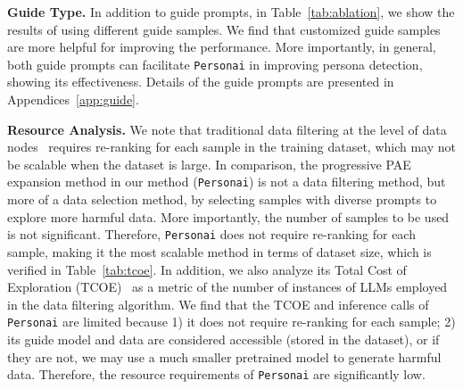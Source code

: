 {\textbf{Guide Type.} In addition to guide prompts, in Table~\ref{tab:ablation}, we show the results of using different guide samples. We find that customized guide samples are more helpful for improving the performance. More importantly, in general, both guide prompts can facilitate \texttt{Personai} in improving persona detection, showing its effectiveness. Details of the guide prompts are presented in Appendices~\ref{app:guide}.

\textbf{Resource Analysis.} We note that traditional data filtering at the level of data nodes~\cite{bai2024} requires re-ranking for each sample in the training dataset, which may not be scalable when the dataset is large. In comparison, the progressive PAE expansion method in our method (\texttt{Personai}) is not a data filtering method, but more of a data selection method, by selecting samples with diverse prompts to explore more harmful data. More importantly, the number of samples to be used is not significant. Therefore, \texttt{Personai} does not require re-ranking for each sample, making it the most scalable method in terms of dataset size, which is verified in Table~\ref{tab:tcoe}. In addition, we also analyze its Total Cost of Exploration (TCOE)~\cite{gilmer2017few} as a metric of the number of instances of LLMs employed in the data filtering algorithm. We find that the TCOE and inference calls of \texttt{Personai} are limited because 1) it does not require re-ranking for each sample; 2) its guide model and data are considered accessible (stored in the dataset), or if they are not, we may use a much smaller pretrained model to generate harmful data. Therefore, the resource requirements of \texttt{Personai} are significantly low.

\begin{table}[!t]
\centering
\caption{Total cost of exploration (TCOE)~\cite{gilmer2017few} and total inference calls for data filtering shown in the training dataset.}
\label{tab:tcoe}
\end{table}

}
